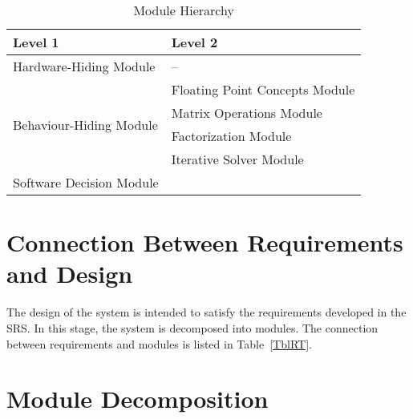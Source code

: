 \documentclass[12pt, titlepage]{article}
\begin{document}
\begin{table}[h!]
  \centering
  \begin{tabular}{p{} p{}}
    \toprule
    \textbf{Level 1}                                            & \textbf{Level 2}                     \\
    \midrule
    {Hardware-Hiding Module}                              & --                             \\
    \midrule
    \multirow{4}{0.3\textwidth}{Behaviour-Hiding Module}  & Floating Point Concepts Module \\
                                                          & Matrix Operations Module       \\
                                                          & Factorization Module           \\
                                                          & Iterative Solver Module        \\
    \midrule
    \multirow{1}{0.3\textwidth}{Software Decision Module} &                                \\
    \bottomrule
  \end{tabular}
  \caption{Module Hierarchy}
  \label{TblMH}
\end{table}

\section{Connection Between Requirements and Design} \label{SecConnection}

The design of the system is intended to satisfy the requirements developed in
the SRS. In this stage, the system is decomposed into modules. The connection
between requirements and modules is listed in Table~\ref{TblRT}.


\section{Module Decomposition} \label{SecMD}
\end{document}
